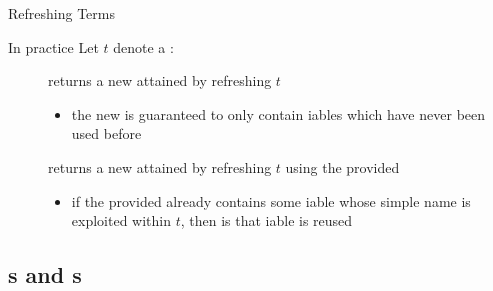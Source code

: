 \documentclass[handout]{beamer}
\begin{document}
\begin{frame}[allowframebreaks]{Refreshing Terms}
    \begin{block}{In practice}
        Let $t$ denote a :
        \begin{description}
            \item[] returns a new  attained by refreshing $t$
            \begin{itemize}\small
                \item the new  is guaranteed to only contain iables which have \alert{never} been used before
            \end{itemize}
            \item[] returns a new  attained by refreshing $t$ using the provided 
            \begin{itemize}\small
                \item if the provided  already contains some iable whose simple name is exploited within $t$, then is that iable is reused
            \end{itemize}
        \end{description}
    \end{block}

\end{frame}

\subsection{s and s}
\end{document}

